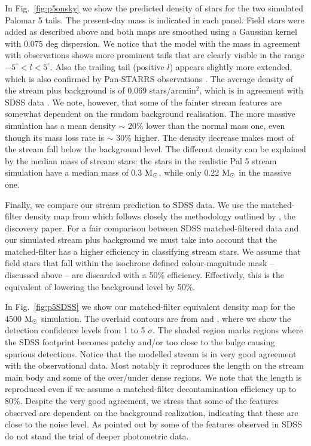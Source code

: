 \documentclass[useAMS,usenatbib,fleqn]{mnras}
\newcommand{\msun}{{\rm M}_\odot}
\begin{document}
In Fig.~\ref{fig:p5onsky} we show the predicted density of stars for the two
simulated Palomar 5 tails. The present-day mass is indicated in each panel.
Field stars were added as described above and both maps are smoothed using a
Gaussian kernel with 0.075 deg dispersion. We notice that the model with the
mass in agreement with observations shows more prominent tails that are clearly
visible in the range $-5^{\circ} < l < 5^{\circ}$. Also the trailing tail (positive $l$) appears
slightly more extended, which is also confirmed by Pan-STARRS observations
\citep{Bernard16}.  The average density of the stream plus background is of
0.069 stars/arcmin$^2$, which is in agreement with SDSS data
\citep{Odenkirchen01}. We note, however, that some of the fainter stream
features are somewhat dependent on the random background realisation. The more
massive simulation has a mean density $\sim$ 20\% lower than the normal mass
one, even though its mass loss rate is $\sim$ 30\% higher. The density decrease
makes most of the stream fall below the background level. The different density
can be explained by the median mass of stream stars: the stars in the realistic
Pal 5 stream simulation have a median mass of 0.3 $\msun$, while only 0.22
$\msun$ in the massive one.

Finally, we compare our stream prediction to SDSS data. We use the
matched-filter density map from \citet{Balbinot11,Kuepper15} which follows
closely the methodology outlined by \citet{Odenkirchen01}, the discovery paper.
For a fair comparison between SDSS matched-filtered data and our simulated
stream plus background we must take into account that the matched-filter has a
higher efficiency in classifying stream stars. We assume that field stars that
fall within the isochrone defined colour-magnitude mask -- discussed above --
are discarded with a 50\% efficiency. Effectively, this is the equivalent of
lowering the background level by 50\%.

In Fig.~\ref{fig:p5SDSS} we show our matched-filter equivalent density map for
the 4500 $\msun$ simulation. The overlaid contours are from \citet{Balbinot11}
and \citet{Kuepper15}, where we show the detection confidence levels from 1 to 5
$\sigma$. The shaded region marks regions where the SDSS footprint becomes
patchy and/or too close to the bulge causing spurious detections. Notice that
the modelled stream is in very good agreement with the observational data.
Most notably it reproduces the length on the stream main body and some of the
over/under dense regions. We note that the length is reproduced even if we
assume a matched-filter decontamination efficiency up to 80\%. Despite the very
good agreement, we stress that some of the features observed are dependent on
the background realization, indicating that these are close to the noise level.
As pointed out by \citet{Thomas16} some of the features observed in SDSS do not
stand the trial of deeper photometric data.
\end{document}
